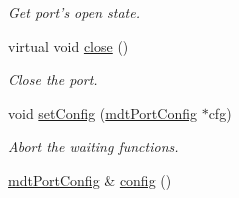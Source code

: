 \begin{DoxyCompactItemize}
\begin{DoxyCompactList}\small\item\em Get port's open state. \end{DoxyCompactList}\item 
virtual void \hyperlink{classmdt_abstract_port_a1ace1a2bd1a04f16952980e247b04800}{close} ()
\begin{DoxyCompactList}\small\item\em Close the port. \end{DoxyCompactList}\item 
void \hyperlink{classmdt_abstract_port_a48bdc0a8057c3b119763643098cf798f}{setConfig} (\hyperlink{classmdt_port_config}{mdtPortConfig} $\ast$cfg)
\begin{DoxyCompactList}\small\item\em Abort the waiting functions. \end{DoxyCompactList}\item 
\hypertarget{classmdt_abstract_port_a3d105c90696f7c40f29c24fe9b6e4481}{
\hyperlink{classmdt_port_config}{mdtPortConfig} \& \hyperlink{classmdt_abstract_port_a3d105c90696f7c40f29c24fe9b6e4481}{config} ()}
\label{classmdt_abstract_port_a3d105c90696f7c40f29c24fe9b6e4481}


\end{DoxyCompactItemize}

